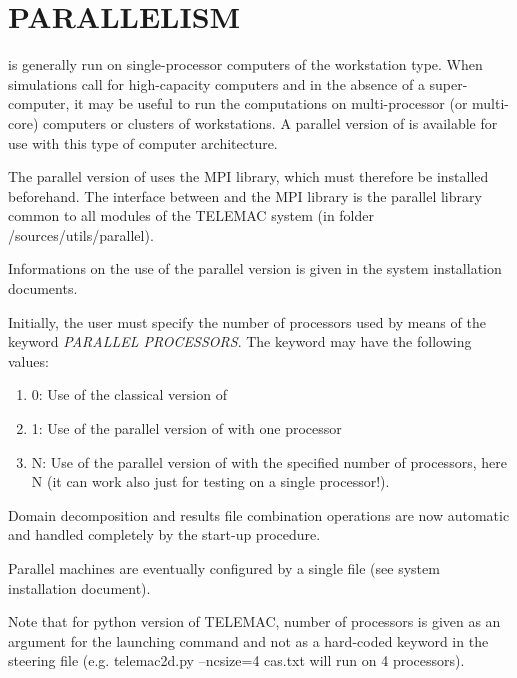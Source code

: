 

\chapter{ PARALLELISM}
\label{ch:paral}
  is generally run on single-processor computers of the workstation type. When simulations call for high-capacity computers and in the absence of a super-computer, it may be useful to run the computations on multi-processor (or multi-core) computers or clusters of workstations. A parallel version of  is available for use with this type of computer architecture.

 The parallel version of  uses the MPI library, which must therefore be installed beforehand. The interface between  and the MPI library is the parallel library common to all modules of the TELEMAC system (in folder /sources/utils/parallel).

 Informations on the use of the parallel version is given in the system installation documents.

 Initially, the user must specify the number of processors used by means of the keyword \textit{PARALLEL PROCESSORS}. The keyword may have the following values:

\begin{enumerate}
\item [\nonumber] 0: Use of the classical version of 

\item [\nonumber] 1: Use of the parallel version of  with one processor

\item [\nonumber] N: Use of the parallel version of  with the specified number of processors, here N (it can work also just for testing on a single processor!).
\end{enumerate}

 Domain decomposition and results file combination operations are now automatic and handled completely by the start-up procedure.

 Parallel machines are eventually configured by a single file (see system installation document).

 Note that for python version of TELEMAC, number of processors is given as an argument for the launching command and not as a hard-coded keyword in the steering file (e.g. telemac2d.py --ncsize=4 cas.txt will run  on 4 processors).







